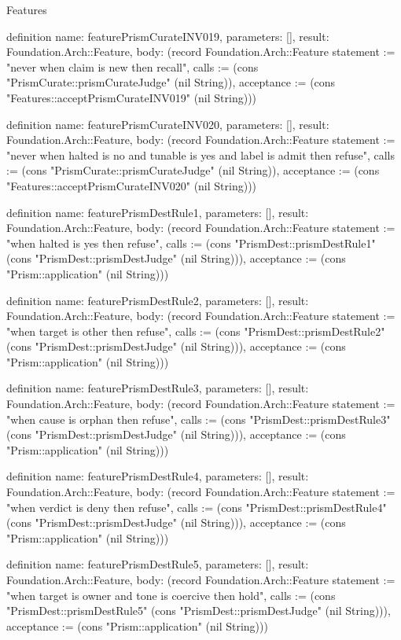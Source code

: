 \begin{lexlean}{Features}
\begin{semanticmodule}
definition{
  name: featurePrismCurateINV019,
  parameters: [],
  result: Foundation.Arch::Feature,
  body: (record Foundation.Arch::Feature {statement := "never when claim is new then recall", calls := (cons "PrismCurate::prismCurateJudge" (nil String)), acceptance := (cons "Features::acceptPrismCurateINV019" (nil String))})
}

definition{
  name: featurePrismCurateINV020,
  parameters: [],
  result: Foundation.Arch::Feature,
  body: (record Foundation.Arch::Feature {statement := "never when halted is no and tunable is yes and label is admit then refuse", calls := (cons "PrismCurate::prismCurateJudge" (nil String)), acceptance := (cons "Features::acceptPrismCurateINV020" (nil String))})
}

definition{
  name: featurePrismDestRule1,
  parameters: [],
  result: Foundation.Arch::Feature,
  body: (record Foundation.Arch::Feature {statement := "when halted is yes then refuse", calls := (cons "PrismDest::prismDestRule1" (cons "PrismDest::prismDestJudge" (nil String))), acceptance := (cons "Prism::application" (nil String))})
}

definition{
  name: featurePrismDestRule2,
  parameters: [],
  result: Foundation.Arch::Feature,
  body: (record Foundation.Arch::Feature {statement := "when target is other then refuse", calls := (cons "PrismDest::prismDestRule2" (cons "PrismDest::prismDestJudge" (nil String))), acceptance := (cons "Prism::application" (nil String))})
}

definition{
  name: featurePrismDestRule3,
  parameters: [],
  result: Foundation.Arch::Feature,
  body: (record Foundation.Arch::Feature {statement := "when cause is orphan then refuse", calls := (cons "PrismDest::prismDestRule3" (cons "PrismDest::prismDestJudge" (nil String))), acceptance := (cons "Prism::application" (nil String))})
}

definition{
  name: featurePrismDestRule4,
  parameters: [],
  result: Foundation.Arch::Feature,
  body: (record Foundation.Arch::Feature {statement := "when verdict is deny then refuse", calls := (cons "PrismDest::prismDestRule4" (cons "PrismDest::prismDestJudge" (nil String))), acceptance := (cons "Prism::application" (nil String))})
}

definition{
  name: featurePrismDestRule5,
  parameters: [],
  result: Foundation.Arch::Feature,
  body: (record Foundation.Arch::Feature {statement := "when target is owner and tone is coercive then hold", calls := (cons "PrismDest::prismDestRule5" (cons "PrismDest::prismDestJudge" (nil String))), acceptance := (cons "Prism::application" (nil String))})
}


\end{semanticmodule}
\end{lexlean}
